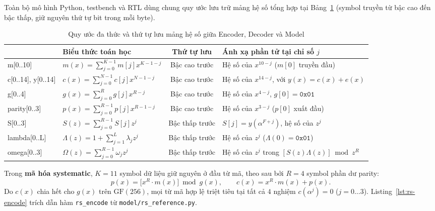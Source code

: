 \documentclass[11pt,a4paper]{report}
\begin{document}
Toàn bộ mô hình Python, testbench và RTL dùng chung quy ước lưu trữ mảng hệ số tổng hợp tại Bảng~\ref{tab:poly-order} (symbol truyền từ bậc cao đến bậc thấp, giữ nguyên thứ tự bit trong mỗi byte).

\begin{table}[!htb]
    \centering
    \caption{Quy ước đa thức và thứ tự lưu mảng hệ số giữa Encoder, Decoder và Model}
    \label{tab:poly-order}
    \footnotesize
    \begin{tabularx}{\textwidth}{@{}>{\ttfamily}l l c X@{}}
        \toprule
        \multicolumn{1}{@{}l}{\textbf{Mảng / Đa thức}} & \textbf{Biểu thức toán học} & \textbf{Thứ tự lưu} & \textbf{Ánh xạ phần tử tại chỉ số $j$} \\
        \midrule
        m[0..10] & $m(x) = \sum_{j=0}^{K-1} m[j] x^{K-1-j}$ & Bậc cao trước & Hệ số của $x^{10-j}$ ($m[0]$ truyền đầu) \\
        c[0..14], y[0..14] & $c(x) = \sum_{j=0}^{N-1} c[j] x^{N-1-j}$ & Bậc cao trước & Hệ số của $x^{14-j}$, với $y(x) = c(x) + e(x)$ \\
        g[0..4] & $g(x) = \sum_{j=0}^{R} g[j] x^{R-j}$ & Bậc cao trước & Hệ số của $x^{4-j}$, $g[0] = \texttt{0x01}$ \\
        parity[0..3] & $p(x) = \sum_{j=0}^{R-1} p[j] x^{R-1-j}$ & Bậc cao trước & Hệ số của $x^{3-j}$ ($p[0]$ xuất đầu) \\
        S[0..3] & $S(z) = \sum_{j=0}^{R-1} S[j] z^j$ & Bậc thấp trước & $S[j] = y(\alpha^{F+j})$, hệ số của $z^j$ \\
        lambda[0..L] & $\Lambda(z) = 1 + \sum_{j=1}^{L} \lambda_j z^j$ & Bậc thấp trước & Hệ số của $z^j$ ($\Lambda(0) = \texttt{0x01}$) \\
        omega[0..3] & $\Omega(z) = \sum_{j=0}^{R-1} \omega_j z^j$ & Bậc thấp trước & Hệ số của $z^j$ trong $[S(z)\Lambda(z)] \bmod z^R$ \\
        \bottomrule
    \end{tabularx}
\end{table}

Trong \textbf{mã hóa systematic}, $K = 11$ symbol dữ liệu giữ nguyên ở đầu từ mã, theo sau bởi $R = 4$ symbol phần dư parity:
\begin{equation}
    p(x) = \bigl[x^R \cdot m(x)\bigr] \bmod g(x), \qquad c(x) = x^R \cdot m(x) + p(x).
    \label{eq:sys-codeword}
\end{equation}
Do $c(x)$ chia hết cho $g(x)$ trên $\text{GF}(256)$, mọi từ mã hợp lệ triệt tiêu tại tất cả $4$ nghiệm $c(\alpha^j) = 0$ ($j=0\dots 3$). Listing~\ref{lst:rs-encode} trích dẫn hàm \texttt{rs\_encode} từ \texttt{model/rs\_reference.py}.
\end{document}
